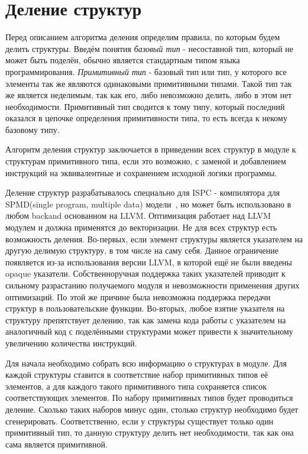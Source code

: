 \section{Деление структур}
\label{sec:Background}

Перед описанием алгоритма деления определим правила, по которым будем делить структуры.
Введём понятия \emph{базовый тип} - несоставной тип, который не может быть поделён, обычно является стандартным типом языка программирования.
\emph{Примитивный тип} - базовый тип или тип, у которого все элементы так же являются одинаковыми примитивными типами.
Такой тип так же является неделимым, так как его, либо невозможно делить, либо в этом нет необходимости.
Примитивный тип сводится к тому типу, который последний оказался в цепочке определения примитивности типа, то есть всегда к некому базовому типу.

Алгоритм деления структур заключается в приведении всех структур в модуле к структурам примитивного типа, если это возможно, с заменой и добавлением инструкций на эквивалентные и сохранением исходной логики программы.

Деление структур разрабатывалось специально для ISPC - компилятора для SPMD(single program, multiple data) модели~\cite{ISPC}, но может быть использовано в любом backand основанном на LLVM.
Оптимизация работает над LLVM модулем и должна применятся до векторизации.
Не для всех структур есть возможность деления.
Во-первых, если элемент структуры является указателем на другую делимую структуру, в том числе на саму себя.
Данное ограничение появляется из-за использования версии LLVM, в которой ещё не были введены opaque указатели.
Собственноручная поддержка таких указателей приводит к сильному разрастанию получаемого модуля и невозможности применения других оптимизаций.
По этой же причине была невозможна поддержка передачи структур в пользовательские функции.
Во-вторых, любое взятие указателя на структуру препятствует делению, так как замена кода работы с указателем на аналогичный код с поделёнными структурами может привести к значительному увеличению количества инструкций.

Для начала необходимо собрать всю информацию о структурах в модуле.
Для каждой структуры ставится в соответствие набор примитивных типов её элементов, а для каждого такого примитивного типа сохраняется список соответствующих элементов.
По набору примитивных типов будет проводиться деление.
Сколько таких наборов минус один, столько структур необходимо будет сгенерировать.
Соответственно, если у структуры существует только один примитивный тип, то данную структуру делить нет необходимости, так как она сама является примитивной.

